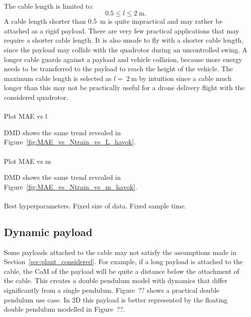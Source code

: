         \paragraph{}
        The cable length is limited to:
        \begin{equation}
            0.5 \leq l \leq \SI{2}{\metre} .
        \end{equation}
        A cable length shorter than \SI{0.5}{\metre} is quite impractical and may rather be attached as a rigid payload.
        There are very few practical applications that may require a shorter cable length.
        It is also unsafe to fly with a shorter cable length, 
        since the payload may collide with the quadrotor during an uncontrolled swing.
        A longer cable guards against a payload and vehicle collision, 
        because more energy needs to be transferred to the payload to reach the height of the vehicle. 
        The maximum cable length is selected as $l=~\SI{2}{\metre}$ by intuition 
        since a cable much longer than this may not be practically useful for a drone delivery flight with the considered quadrotor.

        \paragraph{}
        Plot MAE vs l
        
        DMD shows the same trend revealed in Figure~\ref{fig:MAE_vs_Ntrain_vs_L_havok}.

        \paragraph{}
        Plot MAE vs m
        
        DMD shows the same trend revealed in Figure~\ref{fig:MAE_vs_Ntrain_vs_m_havok}.

        \paragraph{}

        Best hyperparameters.
        Fixed size of data.
        Fixed sample time.

    \subsection{Dynamic payload} \label{sec:dynamic_payload}
        Some payloads attached to the cable may not satisfy the assumptions made in Section~\ref{sec:plant_considered}.
        For example, if a long payload is attached to the cable, the CoM of the payload will be quite a distance below the attachment of the cable.
        This creates a double pendulum model with dynamics that differ significantly from a single pendulum.
        Figure~?? shows a practical double pendulum use case. 
        In 2D this payload is better represented by the floating double pendulum modelled in Figure~??.

